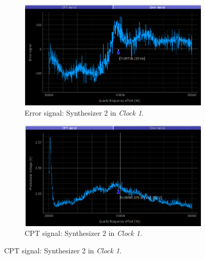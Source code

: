 \documentclass[a4paper,12pt]{article}
\begin{document}
\begin{figure}[!h]
\centering
\begin{subfigure}[b]{0.49\textwidth}
\centering
\includegraphics[height=0.5\textwidth]{Images/c1_synth_2_2_2.png}
\captionsetup{justification=centering}
\caption{Error signal: Synthesizer 2 in \textit{Clock 1}.}
\end{subfigure}
\hfill
\begin{subfigure}[b]{0.49\textwidth}
\centering
\includegraphics[height=0.5\textwidth]{Images/c1_synth_2_1_2.png}
\captionsetup{justification=centering}
\caption{CPT signal: Synthesizer 2 in \textit{Clock 1}.}
\end{subfigure}


\end{figure}
\end{document}
